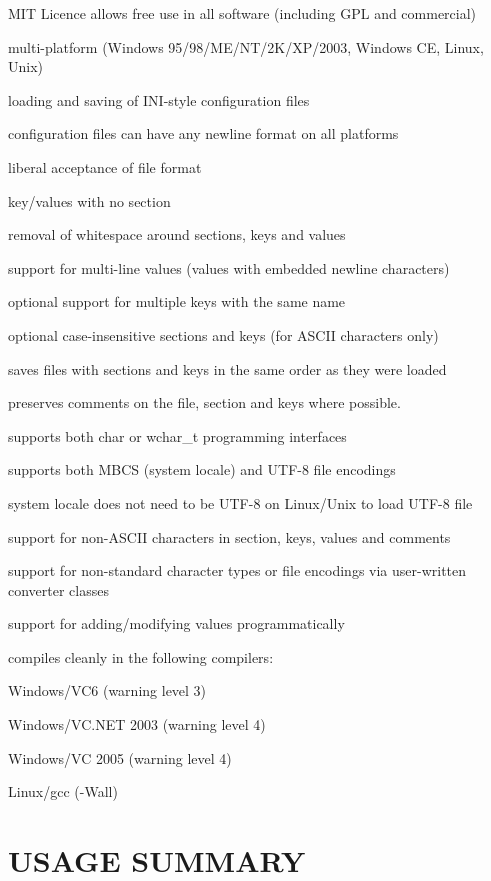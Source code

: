 \begin{DoxyItemize}
\item M\+IT Licence allows free use in all software (including G\+PL and commercial)
\item multi-\/platform (Windows 95/98/\+M\+E/\+N\+T/2\+K/\+X\+P/2003, Windows CE, Linux, Unix)
\item loading and saving of I\+N\+I-\/style configuration files
\item configuration files can have any newline format on all platforms
\item liberal acceptance of file format
\begin{DoxyItemize}
\item key/values with no section
\item removal of whitespace around sections, keys and values
\end{DoxyItemize}
\item support for multi-\/line values (values with embedded newline characters)
\item optional support for multiple keys with the same name
\item optional case-\/insensitive sections and keys (for A\+S\+C\+II characters only)
\item saves files with sections and keys in the same order as they were loaded
\item preserves comments on the file, section and keys where possible.
\item supports both char or wchar\+\_\+t programming interfaces
\item supports both M\+B\+CS (system locale) and U\+T\+F-\/8 file encodings
\item system locale does not need to be U\+T\+F-\/8 on Linux/\+Unix to load U\+T\+F-\/8 file
\item support for non-\/\+A\+S\+C\+II characters in section, keys, values and comments
\item support for non-\/standard character types or file encodings via user-\/written converter classes
\item support for adding/modifying values programmatically
\item compiles cleanly in the following compilers\+:
\begin{DoxyItemize}
\item Windows/\+V\+C6 (warning level 3)
\item Windows/\+V\+C.\+N\+ET 2003 (warning level 4)
\item Windows/\+VC 2005 (warning level 4)
\item Linux/gcc (-\/\+Wall)
\end{DoxyItemize}
\end{DoxyItemize}\hypertarget{index_usage}{}\section{U\+S\+A\+G\+E S\+U\+M\+M\+A\+RY}\label{index_usage}

